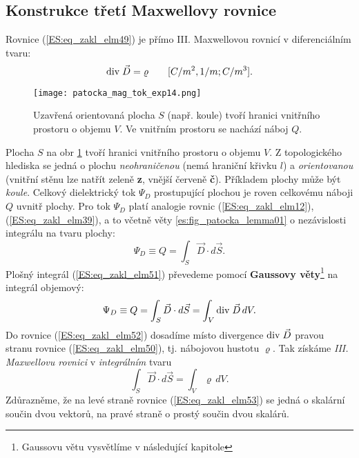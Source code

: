     \subsection{Konstrukce třetí Maxwellovy rovnice}\label{ES:ssec02}
      Rovnice (\ref{ES:eq_zakl_elm49}) je přímo III. Maxwellovou rovnicí v diferenciálním tvaru:
      \begin{equation}\label{ES:eq_zakl_elm50}
        \mathrm{div}\;\vec{D} = \varrho \qquad [C/m^2, 1/m; C/m^3]. 
      \end{equation} 
      \begin{figure}[ht!]
        \centering
        \texttt{[image: patocka\_mag\_tok\_exp14.png]}
        \caption{Uzavřená orientovaná plocha \(S\) (např. koule) tvoří hranici vnitřního prostoru o 
                 objemu \(V\). Ve vnitřním prostoru se nachází náboj \(Q\).}
        \label{es:fig_patocka_mag_tok_exp14}
      \end{figure}
      
      Plocha \(S\) na obr \ref{es:fig_patocka_mag_tok_exp14} tvoří hranici vnitřního prostoru o 
      objemu \(V\). Z topologického hlediska se jedná o plochu \emph{neohraničenou} (nemá hraniční 
      křivku \(l\)) a \emph{orientovanou} (vnitřní stěnu lze natřít zeleně \textbf{z}, vnější 
      červeně \textbf{č}). Příkladem plochy může být \emph{koule}. Celkový dielektrický tok 
      \(\Psi_D\) prostupující plochou je roven celkovému náboji \(Q\) uvnitř plochy. Pro tok 
      \(\Psi_D\) platí analogie rovnic (\ref{ES:eq_zakl_elm12}), (\ref{ES:eq_zakl_elm39}), a to 
      včetně věty \ref{es:fig_patocka_lemma01} o nezávislosti integrálu na tvaru plochy:
      \begin{equation}\label{ES:eq_zakl_elm51}
        \Psi_D \equiv Q = \int_S\vec{D}\cdot d\vec{S}.
      \end{equation} 
      Plošný integrál (\ref{ES:eq_zakl_elm51}) převedeme pomocí \textbf{Gaussovy 
      věty}\footnote{Gaussovu větu vysvětlíme v následující kapitole} na integrál objemový:
      \begin{equation}\label{ES:eq_zakl_elm52}
        \Psi_D \equiv Q = \int_S\vec{D}\cdot d\vec{S} = \int_V\mathrm{div}\;\vec{D}\,dV.
      \end{equation} 
      Do rovnice (\ref{ES:eq_zakl_elm52}) dosadíme místo divergence \(\mathrm{div}\;\vec{D}\) pravou stranu 
      rovnice (\ref{ES:eq_zakl_elm50}), tj. nábojovou hustotu \(\varrho\). Tak získáme \emph{III. 
      Maxwellovu rovnici} v \emph{integrálním} tvaru
      \begin{equation}\label{ES:eq_zakl_elm53}
        \boxed{\int_S\vec{D}\cdot d\vec{S} = \int_V\varrho\,dV}.
      \end{equation} 
      Zdůrazněme, že na levé straně rovnice (\ref{ES:eq_zakl_elm53}) se jedná o skalární součin 
      dvou vektorů, na pravé straně o prostý součin dvou skalárů.
      
